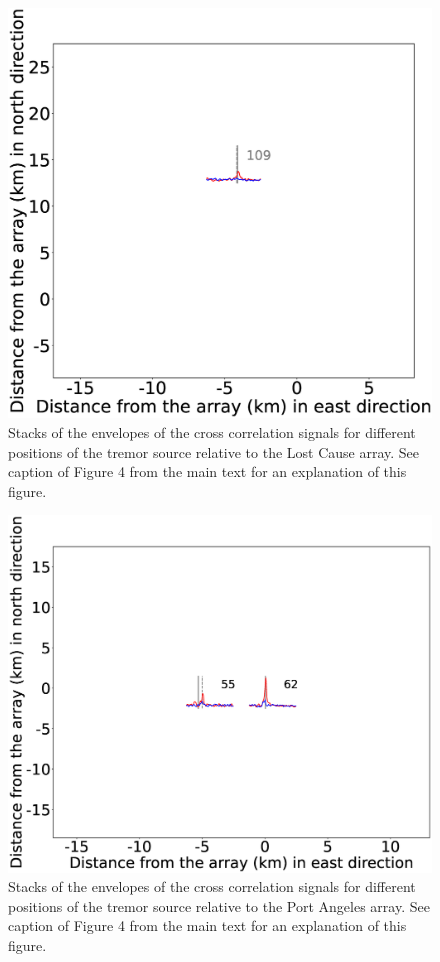 \documentclass[draft]{agujournal2019}
\begin{document}
\begin{figure}
\noindent\includegraphics[width=\textwidth, trim={1cm 0.5cm 2.5cm 1.5cm},clip]{figures/LC_PWS_PWS_0.eps}
\caption{Stacks of the envelopes of the cross correlation signals for different positions of the tremor source relative to the Lost Cause array. See caption of Figure 4 from the main text for an explanation of this figure.}
\label{pngfiguresample}
\end{figure}

\begin{figure}
\noindent\includegraphics[width=\textwidth, trim={1.5cm 0.5cm 4.5cm 1.5cm},clip]{figures/PA_PWS_PWS_0.eps}
\caption{Stacks of the envelopes of the cross correlation signals for different positions of the tremor source relative to the Port Angeles array. See caption of Figure 4 from the main text for an explanation of this figure.}
\label{pngfiguresample}
\end{figure}
\end{document}
